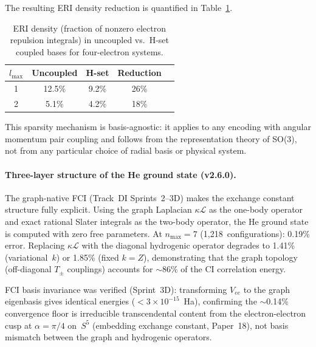 \documentclass[aps,pra,twocolumn,superscriptaddress,longbibliography]{revtex4-2}
\begin{document}
The resulting ERI density reduction is quantified in
Table~\ref{tab:eri_density}.

\begin{table}[t]
\caption{ERI density (fraction of nonzero electron repulsion integrals)
in uncoupled vs.\ H-set coupled bases for four-electron systems.}
\label{tab:eri_density}
\begin{ruledtabular}
\begin{tabular}{ccccc}
$l_{\max}$ & Uncoupled & H-set & Reduction \\
\hline
1 & 12.5\% & 9.2\% & 26\% \\
2 & 5.1\% & 4.2\% & 18\% \\
\end{tabular}
\end{ruledtabular}
\end{table}

This sparsity mechanism is basis-agnostic: it applies to any encoding
with angular momentum pair coupling and follows from the representation
theory of SO(3), not from any particular choice of radial basis or
physical system.

\paragraph{Three-layer structure of the He ground state (v2.6.0).}
The graph-native FCI (Track~DI Sprints~2--3D) makes the exchange constant
structure fully explicit.  Using the graph Laplacian $\kappa\mathcal{L}$
as the one-body operator and exact rational Slater integrals as the
two-body operator, the He ground state is computed with zero free
parameters.  At $n_{\max} = 7$ (1,218~configurations): 0.19\% error.
Replacing $\kappa\mathcal{L}$ with the diagonal hydrogenic operator
degrades to 1.41\% (variational~$k$) or 1.85\% (fixed $k = Z$),
demonstrating that the graph topology (off-diagonal $T_\pm$ couplings)
accounts for $\sim$86\% of the CI correlation energy.

FCI basis invariance was verified (Sprint~3D): transforming $V_{ee}$
to the graph eigenbasis gives identical energies ($< 3 \times 10^{-15}$~Ha),
confirming the $\sim$0.14\% convergence floor is irreducible
transcendental content from the electron-electron cusp at
$\alpha = \pi/4$ on~$S^5$ (embedding exchange constant, Paper~18),
not basis mismatch between the graph and hydrogenic operators.

\end{document}
